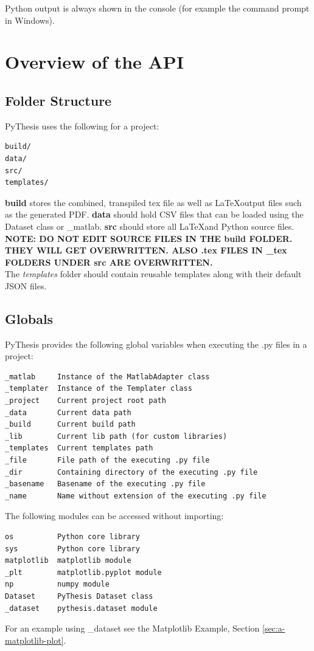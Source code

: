 \documentclass[a4paper]{book}
\begin{document}
Python output is always shown in the console (for example the command prompt in Windows).
\chapter{Overview of the API}
\label{ch:overview-of-the-api}
\section{Folder Structure}
\label{sec:folder-structure}
PyThesis uses the following for a project:
\begin{verbatim}
build/ 
data/
src/
templates/
\end{verbatim}
\textbf{build} stores the combined, transpiled tex file as well as \LaTeX output files such as the generated PDF. \textbf{data} should hold CSV files that can be loaded using the Dataset class or \_matlab. \textbf{src} should store all \LaTeX and Python source files. \\

\textbf{NOTE: DO NOT EDIT SOURCE FILES IN THE build FOLDER. THEY WILL GET OVERWRITTEN. ALSO .tex FILES IN \_tex FOLDERS UNDER src ARE OVERWRITTEN.} \\

The \emph{templates} folder should contain reusable templates along with their default JSON files.
\section{Globals}
\label{sec:globals}
PyThesis provides the following global variables when executing the .py files in a project:
\begin{verbatim}
_matlab     Instance of the MatlabAdapter class
_templater  Instance of the Templater class 
_project    Current project root path
_data       Current data path 
_build      Current build path 
_lib        Current lib path (for custom libraries)
_templates  Current templates path 
_file       File path of the executing .py file 
_dir        Containing directory of the executing .py file 
_basename   Basename of the executing .py file 
_name       Name without extension of the executing .py file 
\end{verbatim}

The following modules can be accessed without importing:
\begin{verbatim}
os          Python core library
sys         Python core library
matplotlib  matplotlib module
_plt        matplotlib.pyplot module
np          numpy module
Dataset     PyThesis Dataset class
_dataset    pythesis.dataset module
\end{verbatim}
For an example using \_dataset see the Matplotlib Example, Section \ref{sec:a-matplotlib-plot}.
\end{document}
